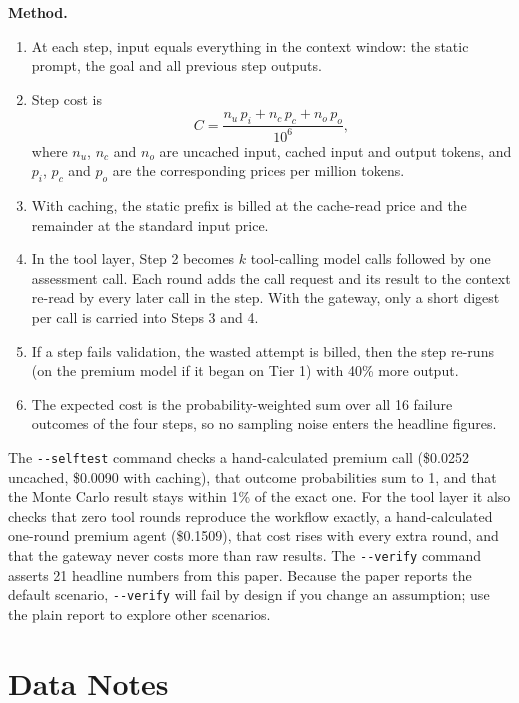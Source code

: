 \documentclass[conference]{IEEEtran}
\begin{document}
\textbf{Method.}
\begin{enumerate}
\item At each step, input equals everything in the context window: the static prompt, the goal and all previous step outputs.
\item Step cost is
\begin{equation}
C = \frac{n_u\,p_i + n_c\,p_c + n_o\,p_o}{10^{6}},
\end{equation}
where $n_u$, $n_c$ and $n_o$ are uncached input, cached input and output tokens, and $p_i$, $p_c$ and $p_o$ are the corresponding prices per million tokens.
\item With caching, the static prefix is billed at the cache-read price and the remainder at the standard input price.
\item In the tool layer, Step 2 becomes $k$ tool-calling model calls followed by one assessment call. Each round adds the call request and its result to the context re-read by every later call in the step. With the gateway, only a short digest per call is carried into Steps 3 and 4.
\item If a step fails validation, the wasted attempt is billed, then the step re-runs (on the premium model if it began on Tier 1) with 40\% more output.
\item The expected cost is the probability-weighted sum over all 16 failure outcomes of the four steps, so no sampling noise enters the headline figures.
\end{enumerate}

The \texttt{-{}-selftest} command checks a hand-calculated premium call (\$0.0252 uncached, \$0.0090 with caching), that outcome probabilities sum to 1, and that the Monte Carlo result stays within 1\% of the exact one. For the tool layer it also checks that zero tool rounds reproduce the workflow exactly, a hand-calculated one-round premium agent (\$0.1509), that cost rises with every extra round, and that the gateway never costs more than raw results. The \texttt{-{}-verify} command asserts 21 headline numbers from this paper. Because the paper reports the default scenario, \texttt{-{}-verify} will fail by design if you change an assumption; use the plain report to explore other scenarios.

\section{Data Notes}
\label{app:notes}
\end{document}
